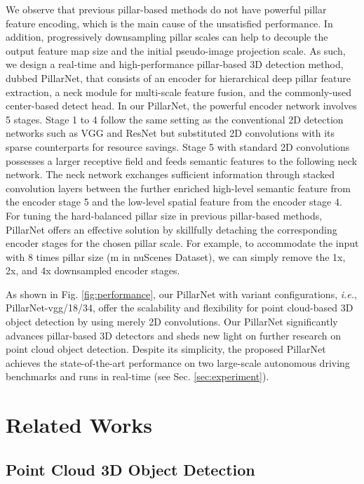 \documentclass[runningheads]{llncs}
\begin{document}
We observe that previous pillar-based methods do not have powerful pillar feature encoding, which is the main cause of the unsatisfied performance. In addition, progressively downsampling pillar scales can help to decouple the output feature map size and the initial pseudo-image projection scale.
As such, we design a real-time and high-performance pillar-based 3D detection method, dubbed PillarNet, that consists of an encoder for hierarchical deep pillar feature extraction, a neck module for multi-scale feature fusion, and the commonly-used center-based detect head.
In our PillarNet, the powerful encoder network involves 5 stages. Stage 1 to 4 follow the same setting as the conventional 2D detection networks such as VGG \cite{simonyan2014very} and ResNet \cite{he2016deep} but substituted 2D convolutions with its sparse counterparts for resource savings. Stage 5 with standard 2D convolutions possesses a larger receptive field and feeds semantic features to the following neck network.
The neck network exchanges sufficient information through stacked convolution layers between the further enriched high-level semantic feature from the encoder stage 5 and the low-level spatial feature from the encoder stage 4.
For tuning the hard-balanced pillar size in previous pillar-based methods, PillarNet offers an effective solution by skillfully detaching the corresponding encoder stages for the chosen pillar scale. For example, to accommodate the input with 8 times pillar size (m in nuScenes Dataset), we can simply remove the 1x, 2x, and 4x downsampled encoder stages.

As shown in Fig. \ref{fig:performance}, our PillarNet with variant configurations, \textit{i.e.}, PillarNet-vgg/18/34, offer the scalability and flexibility for point cloud-based 3D object detection by using merely 2D convolutions.
Our PillarNet significantly advances pillar-based 3D detectors and sheds new light on further research on point cloud object detection.
Despite its simplicity, the proposed PillarNet achieves the state-of-the-art performance on two large-scale autonomous driving benchmarks \cite{caesar2020nuscenes,sun2020scalability} and runs in real-time (see Sec. \ref{sec:experiment}). 


\section{Related Works}

\subsection{Point Cloud 3D Object Detection}
\end{document}
